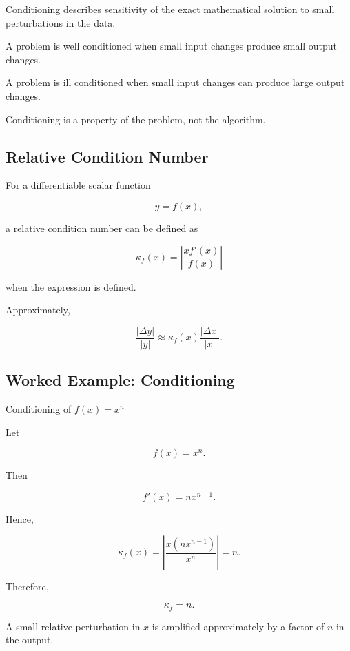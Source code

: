 Conditioning describes sensitivity of the exact mathematical solution to
small perturbations in the data.

A problem is well conditioned when small input changes produce small
output changes.

A problem is ill conditioned when small input changes can produce large
output changes.

Conditioning is a property of the problem, not the algorithm.

\subsection{Relative Condition Number}
\label{subsec:relative-condition-number}

For a differentiable scalar function

\[
y=f(x),
\]

a relative condition number can be defined as

\[
\boxed{
\kappa_f(x)
=
\left|
\frac{
xf'(x)
}{
f(x)
}
\right|
}
\]

when the expression is defined.

Approximately,

\[
\boxed{
\frac{|\Delta y|}{|y|}
\approx
\kappa_f(x)
\frac{|\Delta x|}{|x|}.
}
\]

\subsection{Worked Example: Conditioning}
\label{subsec:worked-conditioning}

\begin{workedexamplebox}{Conditioning of \(f(x)=x^n\)}

Let

\[
f(x)=x^n.
\]

Then

\[
f'(x)=nx^{n-1}.
\]

Hence,

\[
\kappa_f(x)
=
\left|
\frac{
x(nx^{n-1})
}{
x^n
}
\right|
=
n.
\]

Therefore,

\begin{answerbox}
\[
\boxed{
\kappa_f=n.
}
\]
\end{answerbox}

A small relative perturbation in \(x\) is amplified approximately by a
factor of \(n\) in the output.

\end{workedexamplebox}

